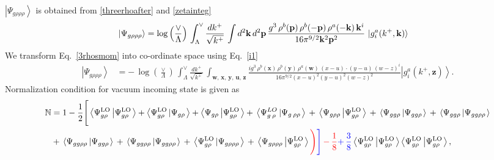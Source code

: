 \documentclass[10pt]{article}
\def\mf#1{\mathbb{#1}}
\numberwithin{equation}{section}
\begin{document}
$\left|\Psi_{g\rho\rho\rho}\right\rangle$ is obtained from \eqref{threerhoafter} and \eqref{zetainteg}
\begin{align}\label{3rhosmom}
    \left|\Psi_{g\rho\rho\rho}\right\rangle & = \log{\left(\frac{\vee}{\Lambda}\right)}\,\int_{\Lambda}^{\vee}\frac{dk^{+}}{\sqrt{k^{+}}}\,\int d^{2}\mathbf{k}\, d^{2}\mathbf{p}\,\frac{g^{3}\,\rho^{b}(\mathbf{p})\,\rho^{b}(-\mathbf{p})\,\rho^{a}(-\mathbf{k})\, \mathbf{k}^{i}}{16\pi^{9/2}\mathbf{k}^{2}\mathbf{p}^{2}}\, \ket{g^{a}_{i}(k^{+},\mathbf{k})}
\end{align}
We transform Eq.~\eqref{3rhosmom} into co-ordinate space using Eq.~\eqref{i1}
\begin{align}\label{3rhospos}
 \left|\Psi_{g\rho\rho\rho}\right\rangle & =  -\,\log{\left(\frac{\vee}{\Lambda}\right)}\,\int_{\Lambda}^{\vee}\frac{dk^{+}}{\sqrt{k^{+}}}\,\int_{\mathbf{w},\, \mathbf{x},\, \mathbf{y},\, \mathbf{u},\, \mathbf{z}}\frac{ig^{3}\,\rho^{b}(\mathbf{x})\,\rho^{b}(\mathbf{y})\,\rho^{a}(\mathbf{w})\, (x-u)\cdot (y-u)\,(w-z)^{i}}{16\pi^{9/2}(x-u)^{2}(y-u)^{2}(w-z)^{2}}\left|g_{i}^{a}(k^{+},\mathbf{z})\right\rangle .
\end{align}
Normalization condition for vacuum incoming state is given as
\begin{align}
    \mf{N} & = 1-\frac{1}{2}\Bigg[\left\langle \Psi_{g\rho}^{\text{LO}}\left|\Psi_{g\rho}^{\text{LO}}\right.\right\rangle + \left\langle \Psi_{g\rho}^{\text{LO}}\left|\Psi_{g\rho}\right.\right\rangle +\left\langle \Psi_{g\rho}\left|\Psi_{g\rho}^{\text{LO}}\right.\right\rangle +\,\left\langle \Psi_{g\:\rho}^{LO}\left|\Psi_{g\:\rho\rho}\right.\right\rangle \,+\,\left\langle \Psi_{g\rho\rho}\left|\Psi_{g\rho}^{\text{LO}}\right.\right\rangle \,+\,\left\langle \Psi_{gg\rho}\left|\Psi_{gg\rho}\right.\right\rangle \,+\,\left\langle \Psi_{gg\rho}\left|\Psi_{gg\rho\rho}\right.\right\rangle \notag \\ & +\,\left\langle \Psi_{gg\rho\rho}\left|\Psi_{gg\rho}\right.\right\rangle\,+\,\left\langle \Psi_{gg\rho\rho}\left|\Psi_{gg\rho\rho}\right.\right\rangle \,+\,\left\langle \Psi_{g\rho}^{\text{LO}}\left|\Psi_{g\rho\rho\rho}\right.\right\rangle \,+\,\left\langle \Psi_{g\rho\rho\rho}\left|\Psi_{g\rho}^{\text{LO}}\right.\right\rangle \textcolor{red}{\Bigg)}\textcolor{blue}{\Bigg]}\,\textcolor{red}{-\,\frac{1}{8}}\textcolor{blue}{+\,\frac{3}{8}}\left\langle \Psi_{g\rho}^{\text{LO}}\left|\Psi_{g\rho}^{\text{LO}}\right.\right\rangle \left\langle \Psi_{g\rho}^{\text{LO}}\left|\Psi_{g\rho}^{\text{LO}}\right.\right\rangle,
\end{align}
\end{document}
